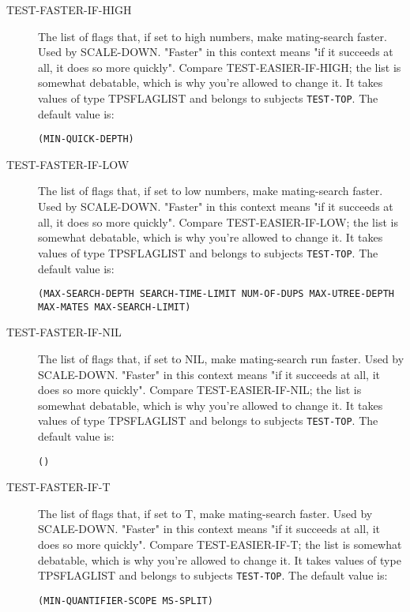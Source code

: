 \begin{description}
\item[TEST-FASTER-IF-HIGH]  
The list of flags that, if set to high numbers, make 
mating-search faster.  Used by SCALE-DOWN. "Faster" in this
context means "if it succeeds at all, it does so more quickly".
Compare TEST-EASIER-IF-HIGH; the list is somewhat debatable, which is 
why you're allowed to change it.
It takes values of type TPSFLAGLIST and belongs to subjects \texttt{TEST-TOP}.  The default value is: \begin{lstlisting}
(MIN-QUICK-DEPTH)
\end{lstlisting}

\item[TEST-FASTER-IF-LOW]  
The list of flags that, if set to low numbers, make 
mating-search faster. Used by SCALE-DOWN. "Faster" in this
context means "if it succeeds at all, it does so more quickly".
Compare TEST-EASIER-IF-LOW; the list is somewhat debatable, which is 
why you're allowed to change it.
It takes values of type TPSFLAGLIST and belongs to subjects \texttt{TEST-TOP}.  The default value is: \begin{lstlisting}
(MAX-SEARCH-DEPTH SEARCH-TIME-LIMIT NUM-OF-DUPS MAX-UTREE-DEPTH MAX-MATES MAX-SEARCH-LIMIT)
\end{lstlisting}

\item[TEST-FASTER-IF-NIL]  
The list of flags that, if set to NIL, make 
mating-search run faster. Used by SCALE-DOWN. "Faster" in this
context means "if it succeeds at all, it does so more quickly".
Compare TEST-EASIER-IF-NIL; the list is somewhat debatable, which is 
why you're allowed to change it.
It takes values of type TPSFLAGLIST and belongs to subjects \texttt{TEST-TOP}.  The default value is: \begin{lstlisting}
()
\end{lstlisting}

\item[TEST-FASTER-IF-T]  
The list of flags that, if set to T, make 
mating-search faster.  Used by SCALE-DOWN. "Faster" in this
context means "if it succeeds at all, it does so more quickly".
Compare TEST-EASIER-IF-T; the list is somewhat debatable, which is 
why you're allowed to change it.
It takes values of type TPSFLAGLIST and belongs to subjects \texttt{TEST-TOP}.  The default value is: \begin{lstlisting}
(MIN-QUANTIFIER-SCOPE MS-SPLIT)
\end{lstlisting}


\end{description}

